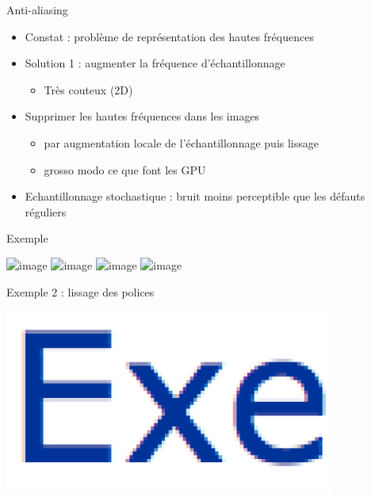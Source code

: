 \begin{frame}[t]{Anti-aliasing}
  \begin{itemize}
    \item Constat : problème de représentation des hautes fréquences
    \item Solution 1 : augmenter la fréquence d'échantillonnage
    \begin{itemize}
      \item Très couteux (2D)
    \end{itemize}
    \item Supprimer les hautes fréquences dans les images
    \begin{itemize}
      \item par augmentation locale de l'échantillonnage puis lissage
      \item grosso modo ce que font les GPU
    \end{itemize}
    \item Echantillonnage stochastique : bruit moins perceptible que les défauts réguliers
  \end{itemize}
\end{frame}


\begin{frame}[t]{Exemple}
  \begin{center}
    \includegraphics<1>[height=3.5cm]{figs/alias3.png}
    \includegraphics<2>[height=7cm]{figs/alias4.png}
    \includegraphics<3>[height=3.5cm]{figs/alias3.png}
    \hspace{0.5cm}
    \includegraphics<3>[height=3.5cm]{figs/alias5.png}

  \end{center}
\end{frame}

\begin{frame}[t]{Exemple 2 : lissage des polices}
  \begin{center}
    \includegraphics[height=6cm]{figs/truetype.png}
  \end{center}
\end{frame}

